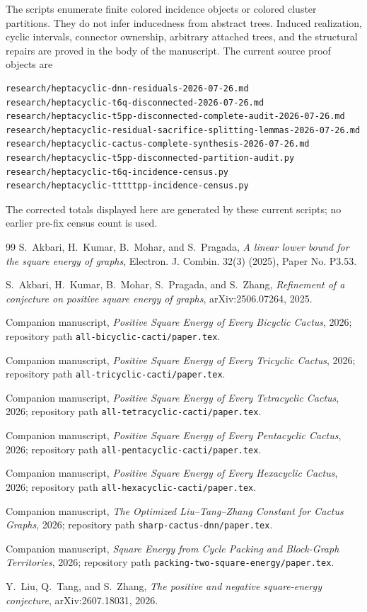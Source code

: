 \documentclass[11pt]{article}
\begin{document}
The scripts enumerate finite colored incidence objects or colored cluster
partitions.  They do not infer inducedness from abstract trees.  Induced
realization, cyclic intervals, connector ownership, arbitrary attached trees,
and the structural repairs are proved in the body of the manuscript.  The
current source proof objects are
\begin{verbatim}
research/heptacyclic-dnn-residuals-2026-07-26.md
research/heptacyclic-t6q-disconnected-2026-07-26.md
research/heptacyclic-t5pp-disconnected-complete-audit-2026-07-26.md
research/heptacyclic-residual-sacrifice-splitting-lemmas-2026-07-26.md
research/heptacyclic-cactus-complete-synthesis-2026-07-26.md
research/heptacyclic-t5pp-disconnected-partition-audit.py
research/heptacyclic-t6q-incidence-census.py
research/heptacyclic-tttttpp-incidence-census.py
\end{verbatim}
The corrected totals displayed here are generated by these current scripts;
no earlier pre-fix census count is used.

\begin{thebibliography}{99}
S.~Akbari, H.~Kumar, B.~Mohar, and S.~Pragada,
\emph{A linear lower bound for the square energy of graphs},
Electron. J. Combin. 32(3) (2025), Paper No. P3.53.

S.~Akbari, H.~Kumar, B.~Mohar, S.~Pragada, and S.~Zhang,
\emph{Refinement of a conjecture on positive square energy of graphs},
arXiv:2506.07264, 2025.

Companion manuscript, \emph{Positive Square Energy of Every Bicyclic Cactus},
2026; repository path \texttt{all-bicyclic-cacti/paper.tex}.

Companion manuscript, \emph{Positive Square Energy of Every Tricyclic Cactus},
2026; repository path \texttt{all-tricyclic-cacti/paper.tex}.

Companion manuscript, \emph{Positive Square Energy of Every Tetracyclic
Cactus}, 2026; repository path \texttt{all-tetracyclic-cacti/paper.tex}.

Companion manuscript, \emph{Positive Square Energy of Every Pentacyclic
Cactus}, 2026; repository path \texttt{all-pentacyclic-cacti/paper.tex}.

Companion manuscript, \emph{Positive Square Energy of Every Hexacyclic
Cactus}, 2026; repository path \texttt{all-hexacyclic-cacti/paper.tex}.

Companion manuscript, \emph{The Optimized Liu--Tang--Zhang Constant for Cactus
Graphs}, 2026; repository path \texttt{sharp-cactus-dnn/paper.tex}.

Companion manuscript, \emph{Square Energy from Cycle Packing and Block-Graph
Territories}, 2026; repository path
\texttt{packing-two-square-energy/paper.tex}.

Y.~Liu, Q.~Tang, and S.~Zhang,
\emph{The positive and negative square-energy conjecture},
arXiv:2607.18031, 2026.
\end{thebibliography}
\end{document}
